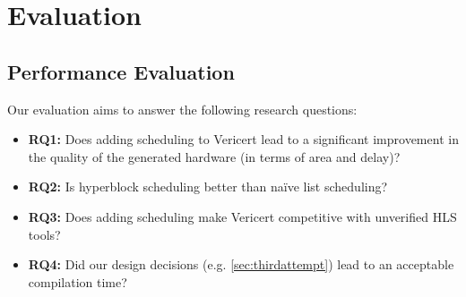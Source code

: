 \chapter{Evaluation}%
\label{sec:evaluation}

\section{Performance Evaluation}
\label{sec:performance-comparison}

Our evaluation aims to answer the following research questions:

\begin{itemize}

\item {\textbf{RQ1:}} Does adding scheduling to Vericert lead to a significant improvement in the quality of the generated hardware (in terms of area and delay)?

\item {\textbf{RQ2:}} Is hyperblock scheduling better than na\"ive list scheduling?

\item {\textbf{RQ3:}} Does adding scheduling make Vericert competitive with unverified HLS tools?

\item {\textbf{RQ4:}} Did our design decisions (e.g. \cref{sec:thirdattempt}) lead to an acceptable compilation time?

\end{itemize}



\newcommand\BambuDefault{%
\setul{-1pt}{3pt}\setulcolor{colorBambuDefaultLIGHT}%
{\ul{\textsf{Bambu-default}}}}

\newcommand\BambuNoOpt{%
\setul{-1pt}{3pt}\setulcolor{colorBambuNoOptLIGHT}%
{\ul{\textsf{Bambu-no-opt}}}}

\newcommand\VericertBase{%
\setul{-1pt}{3pt}\setulcolor{colorVericertBaseLIGHT}%
{\ul{\textsf{Vericert-original}}}}

